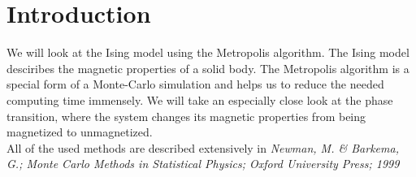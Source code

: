 \section{Introduction}

We will look at the Ising model using the Metropolis algorithm. The Ising model desciribes the magnetic properties of a solid body. The Metropolis algorithm is a special form of a Monte-Carlo simulation and helps us to reduce the needed computing time immensely. We will take an especially close look at the phase transition, where the system changes its magnetic properties from being magnetized to unmagnetized.\\
All of the used methods are described extensively in \emph{Newman, M. \& Barkema, G.; Monte Carlo Methods in Statistical Physics; Oxford University Press; 1999}
